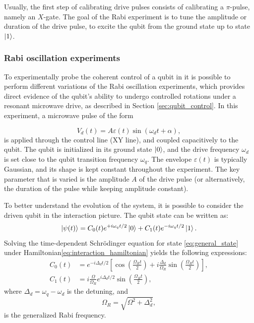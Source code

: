 Usually, the first step of calibrating drive pulses consists of calibrating a $\pi$-pulse, namely an $X$-gate. 
The goal of the Rabi experiment is to tune the amplitude or duration of the drive pulse, to excite the qubit from the ground state up to state $\ket{1}$.

\subsubsection{Rabi oscillation experiments}
To experimentally probe the coherent control of a qubit in \Qibocal it is possible to perform different variations of the Rabi oscillation experiments, which provides direct evidence of the qubit's ability to undergo controlled rotations under a resonant microwave drive, as described in Section \ref{sec:qubit_control}.
In this experiment, a microwave pulse of the form  

\begin{equation}\label{eq:microwave_pulse}
    V_d(t) = A \varepsilon(t) \sin(\omega_d t + \alpha),
\end{equation}
is applied through the control line (XY line), and coupled capacitively to the qubit. 
The qubit is initialized in its ground state $\ket{0}$, and the drive frequency $\omega_d$ is set close to the qubit transition frequency $\omega_q$. 
The envelope $\varepsilon(t)$ is typically Gaussian, and its shape is kept constant throughout the experiment. 
The key parameter that is varied is the amplitude $A$ of the drive pulse (or alternatively, the duration of the pulse while keeping amplitude constant).

To better understand the evolution of the system, it is possible to consider the driven qubit in the interaction picture. 
The qubit state can be written as:
\begin{equation}\label{eq:general_state}
    \ket{\psi(t)} = C_0(t) e^{+i \omega_q t/2} \ket{0} + C_1(t) e^{-i \omega_q t/2} \ket{1}.
\end{equation}
%
Solving the time-dependent Schr\"odinger equation for state \ref{eq:general_state} under Hamiltonian\ref{eq:interaction_hamiltonian} yields the following expressions:
\begin{align}
    C_0(t) &= e^{-i \Delta_d t / 2} \left[ \cos \left( \frac{\Omega_R t}{2} \right) + i \frac{\Delta_d}{\Omega_R} \sin \left( \frac{\Omega_R t}{2} \right) \right], \\
    C_1(t) &= i \frac{\Omega}{\Omega_R} e^{i \Delta_d t / 2} \sin \left( \frac{\Omega_R t}{2} \right),
\end{align}
where $\Delta_d = \omega_q - \omega_d$ is the detuning, and
\begin{equation}
    \Omega_R = \sqrt{\Omega^2 + \Delta_d^2},
\end{equation}
is the generalized Rabi frequency.

